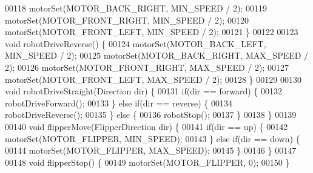 \begin{DoxyCode}
00118   motorSet(MOTOR_BACK_RIGHT, MIN_SPEED / 2);
00119   motorSet(MOTOR_FRONT_RIGHT, MIN_SPEED / 2);
00120   motorSet(MOTOR_FRONT_LEFT, MIN_SPEED / 2);
00121 \}
00122 
00123 \textcolor{keywordtype}{void} robotDriveReverse() \{
00124   motorSet(MOTOR_BACK_LEFT, MIN_SPEED / 2);
00125   motorSet(MOTOR_BACK_RIGHT, MAX_SPEED / 2);
00126   motorSet(MOTOR_FRONT_RIGHT, MAX_SPEED / 2);
00127   motorSet(MOTOR_FRONT_LEFT, MAX_SPEED / 2);
00128 \}
00129 
00130 \textcolor{keywordtype}{void} robotDriveStraight(Direction dir) \{
00131   \textcolor{keywordflow}{if}(dir == forward) \{
00132     robotDriveForward();
00133   \} \textcolor{keywordflow}{else} \textcolor{keywordflow}{if}(dir == reverse) \{
00134     robotDriveReverse();
00135   \} \textcolor{keywordflow}{else} \{
00136     robotStop();
00137   \}
00138 \}
00139 
00140 \textcolor{keywordtype}{void} flipperMove(FlipperDirection dir) \{
00141   \textcolor{keywordflow}{if}(dir == up) \{
00142     motorSet(MOTOR_FLIPPER, MIN_SPEED);
00143   \} \textcolor{keywordflow}{else} \textcolor{keywordflow}{if}(dir == down) \{
00144     motorSet(MOTOR_FLIPPER, MAX_SPEED);
00145   \}
00146 \}
00147 
00148 \textcolor{keywordtype}{void} flipperStop() \{
00149   motorSet(MOTOR_FLIPPER, 0);
00150 \}
\end{DoxyCode}
